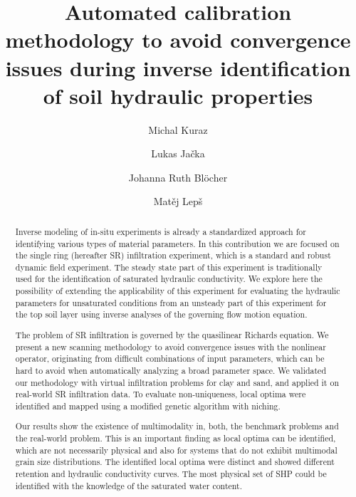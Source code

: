 \documentclass[review,times,3p,10pt]{elsarticle}
\begin{document}
\begin{frontmatter}



\title{Automated calibration methodology to avoid convergence issues during inverse identification of soil  hydraulic properties}

\author[autor1]{Michal Kuraz}

\author[autor1]{Lukas Ja\v{c}ka}

\author[autor1]{Johanna Ruth Bl\"ocher}

\author[autor2]{Mat\v{e}j Lep\v{s}}



\address[autor1]{Czech University of Life Sciences Prague, Faculty of Environmental Sciences, Department of Water Resources and Environmental Modeling, Kam\'yck\'a 129, 165 21 Praha 6 -- Suchdol, Czech Republic}

\address[autor2]{Czech Technical University in Prague, Faculty of Civil Engineering, Department of Mechanics, Th\'akurova 7, 166 29 Praha 6 -- Dejvice, Czech Republic}

\begin{abstract}
Inverse modeling of in-situ experiments is already a standardized approach for identifying various types of material parameters. In this contribution we are focused on 
the single ring (hereafter SR) infiltration experiment, which is a standard and robust dynamic field experiment. The steady state part of this experiment is traditionally used for the identification of saturated hydraulic conductivity. We explore here the possibility of extending the applicability of this experiment for evaluating the  hydraulic parameters for unsaturated conditions from an unsteady part of this experiment for the top soil layer using inverse analyses of the governing flow motion equation.

The problem of SR infiltration is governed by the quasilinear Richards equation. We present a new scanning methodology to avoid convergence issues with the nonlinear operator, originating from difficult combinations of input parameters, which can be hard to avoid when automatically analyzing a broad parameter space. We validated our methodology with virtual infiltration problems for clay and sand, and applied it on real-world SR infiltration data. To evaluate non-uniqueness, local optima were identified and mapped using a modified genetic algorithm with niching.

Our results show the existence of multimodality in, both, the benchmark problems and the real-world problem. This is an important finding as local optima can be identified, which are not necessarily physical and also for systems that do not exhibit multimodal grain size distributions. The identified local optima were distinct and showed different retention and hydraulic conductivity curves. The most physical set of SHP could be identified with the knowledge of the saturated water content. 





\end{abstract}
\end{frontmatter}
\end{document}
